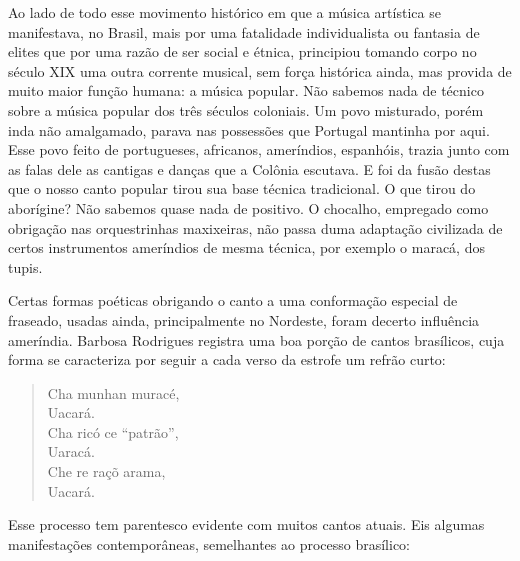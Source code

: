


Ao lado de todo esse movimento histórico em que a música artística se
manifestava, no Brasil, mais por uma fatalidade individualista ou
fantasia de elites que por uma razão de ser social e étnica, principiou
tomando corpo no século XIX uma outra corrente musical, sem força
histórica ainda, mas provida de muito maior função humana: a música
popular. Não sabemos nada de técnico sobre a música popular dos três
séculos coloniais. Um povo misturado, porém inda não amalgamado, parava
nas possessões que Portugal mantinha por aqui. Esse povo feito de
portugueses, africanos, ameríndios, espanhóis, trazia junto com as falas
dele as cantigas e danças que a Colônia escutava. E foi da fusão destas
que o nosso canto popular tirou sua base técnica tradicional. O que
tirou do aborígine? Não sabemos quase nada de positivo. O chocalho,
empregado como obrigação nas orquestrinhas maxixeiras, não passa duma
adaptação civilizada de certos instrumentos ameríndios de mesma técnica,
por exemplo o maracá, dos tupis.

Certas formas poéticas obrigando o canto a uma conformação especial de
fraseado, usadas ainda, principalmente no Nordeste, foram decerto
influência ameríndia. Barbosa Rodrigues registra uma boa porção de
cantos brasílicos, cuja forma se caracteriza por seguir a cada verso da
estrofe um refrão curto:

\begin{verse}
Cha munhan muracé,\\
Uacará.\\
Cha ricó ce ``patrão'',\\
Uaracá.\\
Che re raçõ arama,\\
Uacará.
\end{verse}

Esse processo tem parentesco evidente com muitos cantos atuais. Eis
algumas manifestações contemporâneas, semelhantes ao processo brasílico:

